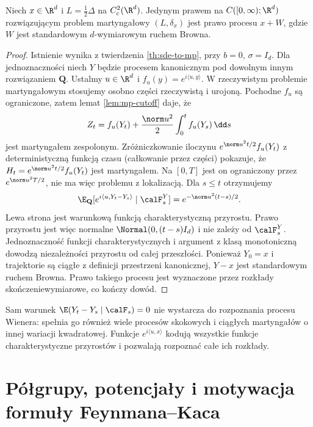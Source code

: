 \begin{twierdzenie}
\label{th:mp-bm}
Niech $x\in\R^d$ i $L=\frac12\Delta$ na $C_c^2(\R^d)$.
Jedynym prawem na $C([0,\infty);\R^d)$ rozwiązującym
problem martyngałowy $(L,\delta_x)$ jest prawo procesu
$x+W$, gdzie $W$ jest standardowym $d$-wymiarowym
ruchem Browna.
\end{twierdzenie}
\begin{proof}
Istnienie wynika z twierdzenia \ref{th:sde-to-mp},
przy $b=0$, $\sigma=I_d$. Dla jednoznaczności niech
$Y$ będzie procesem kanonicznym pod dowolnym innym
rozwiązaniem $\mathbf Q$. Ustalmy $u\in\R^d$ i
$f_u(y)=e^{i\langle u,y\rangle}$. W rzeczywistym
problemie martyngałowym stosujemy osobno części rzeczywistą
i urojoną. Pochodne $f_u$ są ograniczone, zatem lemat
\ref{lem:mp-cutoff} daje, że
\[
Z_t=f_u(Y_t)+\frac{\norm u^2}{2}\int_0^t f_u(Y_s)\,\dd s
\]
jest martyngałem zespolonym. Zróżniczkowanie iloczynu
$e^{\norm u^2t/2}f_u(Y_t)$ z deterministyczną funkcją
czasu (całkowanie przez części) pokazuje, że
$H_t=e^{\norm u^2t/2}f_u(Y_t)$ jest martyngałem.
Na $[0,T]$ jest on ograniczony przez $e^{\norm u^2T/2}$,
nie ma więc problemu z lokalizacją.
Dla $s\le t$ otrzymujemy
\[
\E_{\mathbf Q}[e^{i\langle u,Y_t-Y_s\rangle}\mid\calF_s^Y]
=e^{-\norm u^2(t-s)/2}.
\]
Lewa strona jest warunkową funkcją charakterystyczną
przyrostu. Prawo przyrostu jest więc normalne
$\Normal(0,(t-s)I_d)$ i nie zależy od $\calF_s^Y$.
Jednoznaczność funkcji charakterystycznych i
argument z klasą monotoniczną dowodzą niezależności
przyrostu od całej przeszłości. Ponieważ $Y_0=x$ i
trajektorie są ciągłe z definicji przestrzeni kanonicznej,
$Y-x$ jest standardowym ruchem Browna.
Prawo takiego procesu jest wyznaczone przez rozkłady
skończeniewymiarowe, co kończy dowód.
\end{proof}

\begin{przyklad}
Sam warunek $\E(Y_t-Y_s\mid\calF_s)=0$ nie wystarcza
do rozpoznania procesu Wienera: spełnia go również
wiele procesów skokowych i ciągłych martyngałów o innej
wariacji kwadratowej. Funkcje
$e^{i\langle u,x\rangle}$ kodują wszystkie
funkcje charakterystyczne przyrostów i pozwalają
rozpoznać całe ich rozkłady.
\end{przyklad}

\section{Półgrupy, potencjały i motywacja formuły Feynmana--Kaca}

